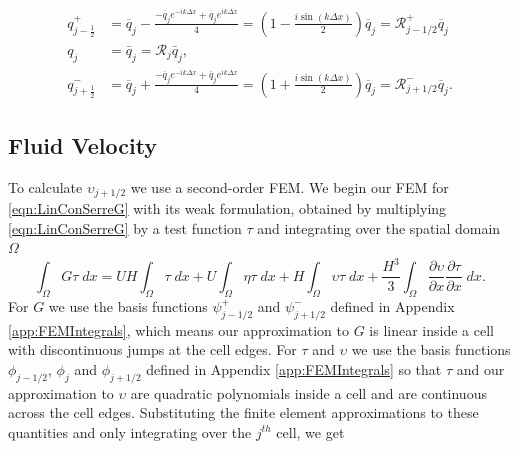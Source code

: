 \begin{subequations}
	\label{eqn:RpmfactorFDVM}
	\begin{align}
	q^+_{j-\frac{1}{2}} &= \overline{q}_j - \frac{- \overline{q}_{j} e^{-ik\Delta x} + \overline{q}_{j} e^{ik\Delta x}}{4} = \left(1  - \frac{i\sin\left(k\Delta x\right)}{2} \right)\overline{q}_{j} = \mathcal{R}^+_{j-1/2}\overline{q}_{j} \\
	q_j &= \bar{q}_j = \mathcal{R}_{j} \bar{q}_j,\\
	q^-_{j+\frac{1}{2}} &=\overline{q}_j + \frac{- \overline{q}_{j} e^{-ik\Delta x} + \overline{q}_{j} e^{ik\Delta x}}{4} = \left(1  + \frac{i\sin\left(k\Delta x\right)}{2} \right)\overline{q}_{j} =\mathcal{R}^-_{j+1/2} \overline{q}_{j}.
	\end{align}
\end{subequations}   



\subsection{Fluid Velocity}
To calculate $\upsilon_{j+1/2}$ we use a second-order FEM. We begin our FEM for \eqref{eqn:LinConSerreG} with its weak formulation, obtained by multiplying \eqref{eqn:LinConSerreG} by a test function $\tau$ and integrating over the spatial domain $\Omega$
\begin{equation*}
\int_{\Omega}G \tau \; dx = UH\int_{\Omega} \tau \; dx + U \int_{\Omega} \eta \tau \; dx +   H\int_{\Omega} \upsilon \tau \; dx  + \frac{H^3}{3} \int_{\Omega} \frac{\partial \upsilon}{\partial x } \frac{\partial \tau}{\partial x }\; dx.
\end{equation*}
For $G$ we use the basis functions $\psi^+_{j - 1/2}$ and $\psi^-_{j + 1/2}$ defined in Appendix \ref{app:FEMIntegrals}, which means our approximation to $G$ is linear inside a cell with discontinuous jumps at the cell edges. For $\tau$ and $\upsilon$ we use the basis functions $\phi_{j-1/2}$, $\phi_{j}$ and $\phi_{j+1/2}$ defined in Appendix \ref{app:FEMIntegrals} so that $\tau$ and our approximation to $\upsilon$ are quadratic polynomials inside a cell and are continuous across the cell edges. Substituting the finite element approximations to these quantities and only integrating over the $j^{th}$ cell, we get

